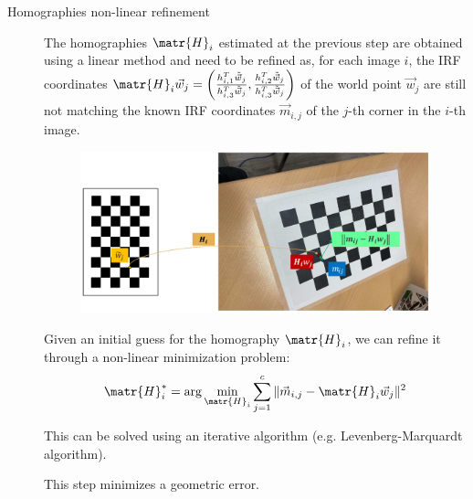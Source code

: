 \begin{description}
    \item[Homographies non-linear refinement]
        The homographies $\matr{H}_i$ estimated at the previous step are obtained using a linear method and need to be refined as, for each image $i$, 
        the IRF coordinates $\matr{H}_i\vec{w}_j = \left( \frac{h_{i, 1}^T \tilde{\vec{w}}_j}{h_{i, 3}^T \tilde{\vec{w}}_j}, \frac{h_{i, 2}^T \tilde{\vec{w}}_j}{h_{i, 3}^T \tilde{\vec{w}}_j} \right)$
        of the world point $\vec{w}_j$ are still not matching the known IRF coordinates $\vec{m}_{i,j}$ of the $j$-th corner in the $i$-th image.
        \begin{figure}[H]
            \centering
            \includegraphics[width=0.7\linewidth]{./img/_homography_refinement.pdf}
        \end{figure}

        Given an initial guess for the homography $\matr{H}_i$, we can refine it through a non-linear minimization problem:
        \[ \matr{H}_i^* = \arg\min_{\matr{H}_i} \sum_{j=1}^{c} \Vert \vec{m}_{i,j} - \matr{H}_i \vec{w}_j \Vert^2 \]

        This can be solved using an iterative algorithm (e.g. Levenberg-Marquardt algorithm).

        \begin{remark}
            This step minimizes a geometric error.
        \end{remark}


\end{description}
